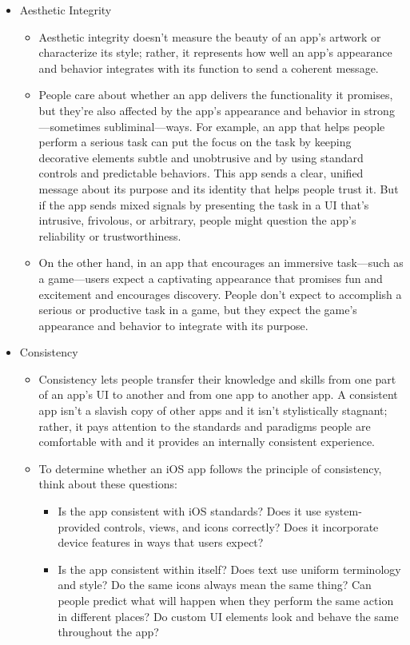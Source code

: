 \begin{itemize}
\item Aesthetic Integrity
	\begin{itemize}
	\item Aesthetic integrity doesn’t measure the beauty of an app’s artwork or characterize its style; rather, it represents how well an app’s appearance and behavior integrates with its function to send a coherent message. 
	\item People care about whether an app delivers the functionality it promises, but they’re also affected by the app’s appearance and behavior in strong—sometimes subliminal—ways. For example, an app that helps people perform a serious task can put the focus on the task by keeping decorative elements subtle and unobtrusive and by using standard controls and predictable behaviors. This app sends a clear, unified message about its purpose and its identity that helps people trust it. But if the app sends mixed signals by presenting the task in a UI that’s intrusive, frivolous, or arbitrary, people might question the app’s reliability or trustworthiness.
	\item On the other hand, in an app that encourages an immersive task—such as a game—users expect a captivating appearance that promises fun and excitement and encourages discovery. People don’t expect to accomplish a serious or productive task in a game, but they expect the game’s appearance and behavior to integrate with its purpose.
	\end{itemize}
\item Consistency
	\begin{itemize}
	\item Consistency lets people transfer their knowledge and skills from one part of an app’s UI to another and from one app to another app. A consistent app isn’t a slavish copy of other apps and it isn’t stylistically stagnant; rather, it pays attention to the standards and paradigms people are comfortable with and it provides an internally consistent experience. 
	\item To determine whether an iOS app follows the principle of consistency, think about these questions:
		\begin{itemize}
		\item Is the app consistent with iOS standards? Does it use system-provided controls, views, and icons correctly? Does it incorporate device features in ways that users expect?
		\item Is the app consistent within itself? Does text use uniform terminology and style? Do the same icons always mean the same thing? Can people predict what will happen when they perform the same action in different places? Do custom UI elements look and behave the same throughout the app?

\end{itemize}
\end{itemize}
\end{itemize}
